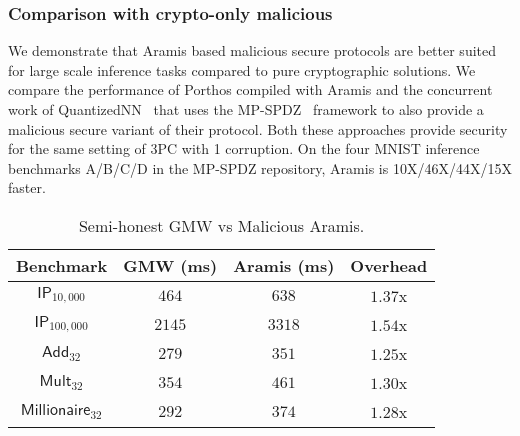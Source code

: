 \subsubsection{Comparison with crypto-only malicious \mpc}
\label{sec:concurrent-comparison}
We demonstrate that Aramis based malicious secure protocols are better suited for large scale inference tasks compared to pure cryptographic solutions. 
We compare the performance of Porthos compiled with Aramis and the concurrent work of QuantizedNN~\cite{quantizednn} that uses the MP-SPDZ~\cite{mpspdz} framework to also provide a malicious secure variant of their protocol. Both these approaches provide security for the same  setting of 3PC with 1 corruption. On the four MNIST inference benchmarks A/B/C/D in the MP-SPDZ repository, Aramis is 10X/46X/44X/15X faster.

\begin{table}
  \centering

      \begin{tabular}{|c|c|c|c|}
    \hline
    Benchmark & GMW (ms) & Aramis (ms) & Overhead \\
    \hline
	$\mathsf{IP}_{10,000}$ & $464$ & $638$ & $1.37$x\\
	\hline
    $\mathsf{IP}_{100,000}$ & $2145$ & $3318$ & $1.54$x \\ 	\hline
    $\mathsf{Add}_{32}$ & $279$ & $351$ & $1.25$x \\ 	\hline
    $\mathsf{Mult}_{32}$ & $354$ & $461$ & $1.30$x \\ 	\hline
    $\mathsf{Millionaire}_{32}$ & $292$ & $374$ & $1.28$x \\ 
	\hline

\end{tabular}
 \caption{Semi-honest GMW vs Malicious Aramis.}
\label{tab:gmwport}

\end{table}

